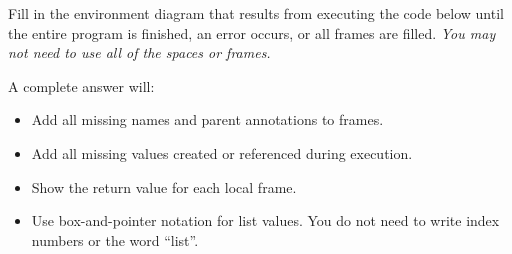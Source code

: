 
Fill in the environment diagram that results from executing the
code below until the entire program is finished, an error occurs, or all frames
are filled.  \emph{You may not need to use all of the spaces or frames.}

A complete answer will:

\begin{itemize}
    \item Add all missing names and parent annotations to frames.
    \item Add all missing values created or referenced during execution.
    \item Show the return value for each local frame.
    \item Use box-and-pointer notation for list values. You do not need to write
    index numbers or the word ``list''.
\end{itemize}

\vspace{0.3in}


